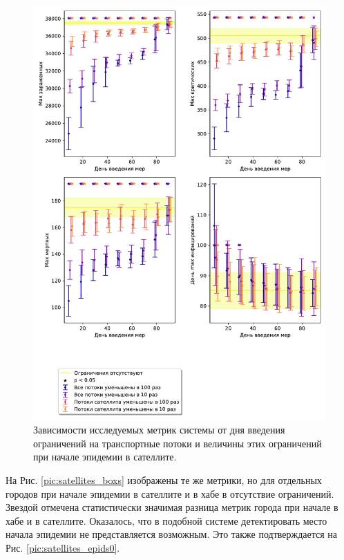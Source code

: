 \documentclass[a4paper,12pt]{article} %
\begin{document}
\begin{figure}[H]
    \centering
    \includegraphics[width=\linewidth]{images/satellites_hists1.pdf}
    \caption{Зависимости исследуемых метрик системы от дня введения ограничений на транспортные потоки и величины этих ограничений при начале эпидемии в сателлите.}
    \label{pic:satellites_hists1}
\end{figure}

На Рис. \ref{pic:satellites_boxs} изображены те же метрики, но для отдельных городов при начале эпидемии в сателлите и в хабе в отсутствие ограничений. Звездой отмечена статистически значимая разница метрик города при начале в хабе и в сателлите. Оказалось, что в подобной системе детектировать место начала эпидемии не представляется возможным. Это также подтверждается на Рис. \ref{pic:satellites_epids0}.
\end{document}
